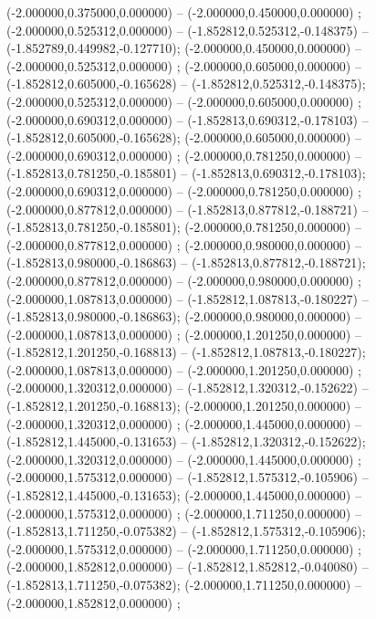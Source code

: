  (-2.000000,0.375000,0.000000) -- (-2.000000,0.450000,0.000000) ;
 (-2.000000,0.525312,0.000000) -- (-1.852812,0.525312,-0.148375) -- (-1.852789,0.449982,-0.127710);
 (-2.000000,0.450000,0.000000) -- (-2.000000,0.525312,0.000000) ;
 (-2.000000,0.605000,0.000000) -- (-1.852812,0.605000,-0.165628) -- (-1.852812,0.525312,-0.148375);
 (-2.000000,0.525312,0.000000) -- (-2.000000,0.605000,0.000000) ;
 (-2.000000,0.690312,0.000000) -- (-1.852813,0.690312,-0.178103) -- (-1.852812,0.605000,-0.165628);
 (-2.000000,0.605000,0.000000) -- (-2.000000,0.690312,0.000000) ;
 (-2.000000,0.781250,0.000000) -- (-1.852813,0.781250,-0.185801) -- (-1.852813,0.690312,-0.178103);
 (-2.000000,0.690312,0.000000) -- (-2.000000,0.781250,0.000000) ;
 (-2.000000,0.877812,0.000000) -- (-1.852813,0.877812,-0.188721) -- (-1.852813,0.781250,-0.185801);
 (-2.000000,0.781250,0.000000) -- (-2.000000,0.877812,0.000000) ;
 (-2.000000,0.980000,0.000000) -- (-1.852813,0.980000,-0.186863) -- (-1.852813,0.877812,-0.188721);
 (-2.000000,0.877812,0.000000) -- (-2.000000,0.980000,0.000000) ;
 (-2.000000,1.087813,0.000000) -- (-1.852812,1.087813,-0.180227) -- (-1.852813,0.980000,-0.186863);
 (-2.000000,0.980000,0.000000) -- (-2.000000,1.087813,0.000000) ;
 (-2.000000,1.201250,0.000000) -- (-1.852812,1.201250,-0.168813) -- (-1.852812,1.087813,-0.180227);
 (-2.000000,1.087813,0.000000) -- (-2.000000,1.201250,0.000000) ;
 (-2.000000,1.320312,0.000000) -- (-1.852812,1.320312,-0.152622) -- (-1.852812,1.201250,-0.168813);
 (-2.000000,1.201250,0.000000) -- (-2.000000,1.320312,0.000000) ;
 (-2.000000,1.445000,0.000000) -- (-1.852812,1.445000,-0.131653) -- (-1.852812,1.320312,-0.152622);
 (-2.000000,1.320312,0.000000) -- (-2.000000,1.445000,0.000000) ;
 (-2.000000,1.575312,0.000000) -- (-1.852812,1.575312,-0.105906) -- (-1.852812,1.445000,-0.131653);
 (-2.000000,1.445000,0.000000) -- (-2.000000,1.575312,0.000000) ;
 (-2.000000,1.711250,0.000000) -- (-1.852813,1.711250,-0.075382) -- (-1.852812,1.575312,-0.105906);
 (-2.000000,1.575312,0.000000) -- (-2.000000,1.711250,0.000000) ;
 (-2.000000,1.852812,0.000000) -- (-1.852812,1.852812,-0.040080) -- (-1.852813,1.711250,-0.075382);
 (-2.000000,1.711250,0.000000) -- (-2.000000,1.852812,0.000000) ;

